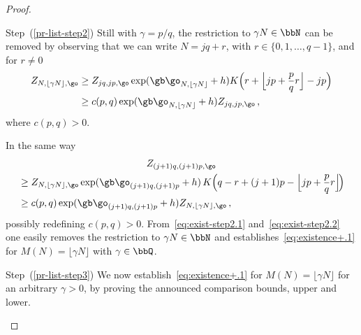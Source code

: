\begin{proof}
\begin{step}{Step~(\ref{pr-list-step2})}
Still with $\gamma =p/q$, the restriction to $\gamma N \in \bbN$ can be removed by observing that we can write $N= jq+r$, with $r\in \{0, 1, \ldots, q-1\}$, and for $r\neq 0$
\begin{equation}\label{eq:exist-step2.1}
\begin{split}
Z_{N, \lfloor \gamma N \rfloor, \go} &\ge Z_{jq, jp, \go} \exp(\gb \go_{N, \lfloor \gamma N \rfloor}+h) K \Big(r+ \Big \lfloor jp+ \frac{p}{q} r \Big \rfloor -jp \Big)
\\ & \ge c(p,q) \exp(\gb \go_{N, \lfloor \gamma N \rfloor}+h) Z_{jq, jp, \go}\,,
\end{split}
\end{equation}
where $c(p,q)>0$.

In the same way
\begin{multline}\label{eq:exist-step2.2}
Z_{(j+1)q, (j+1)p, \go}\\
\begin{aligned}
&\ge Z_{N, \lfloor \gamma N \rfloor, \go} \exp(\gb \go_{(j+1)q, (j+1)p}+h)\,K \Big(q-r+ (j+1)p- \Big \lfloor jp+ \frac{p}{q} r \Big \rfloor\!\Big)\\
&\ge c(p,q) \exp(\gb \go_{(j+1)q, (j+1)p}+h) Z_{N, \lfloor \gamma N \rfloor, \go}\,,
\end{aligned}
\end{multline}
possibly redefining $c(p,q)>0$. From~\eqref{eq:exist-step2.1} and~\eqref{eq:exist-step2.2} one easily removes the restriction to $\gamma N \in \bbN$ and establishes~\eqref{eq:existence+.1} for $M(N) = \lfloor \gamma N \rfloor$ with $\gamma\in \bbQ$.
\end{step}

\begin{step}{Step~(\ref{pr-list-step3})}
We now establish~\eqref{eq:existence+.1} for $M(N)= \lfloor \gamma N\rfloor$ for an arbitrary $\gamma>0$, by proving the announced comparison bounds, upper and lower.


\end{step}
\end{proof}
